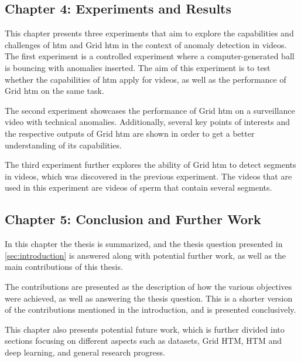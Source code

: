 \subsection*{Chapter 4: Experiments and Results}
This chapter presents three experiments that aim to explore the capabilities and challenges of \gls*{htm} and Grid \gls*{htm} in the context of anomaly detection in videos. The first experiment is a controlled experiment where a computer-generated ball is bouncing with anomalies inserted. The aim of this experiment is to test whether the capabilities of \gls*{htm} apply for videos, as well as the performance of Grid \gls*{htm} on the same task.
\par
The second experiment showcases the performance of Grid \gls*{htm} on a surveillance video with technical anomalies. Additionally, several key points of interests and the respective outputs of Grid \gls*{htm} are shown in order to get a better understanding of its capabilities.
\par
The third experiment further explores the ability of Grid \gls*{htm} to detect segments in videos, which was discovered in the previous experiment. The videos that are used in this experiment are videos of sperm that contain several segments.
\subsection*{Chapter 5: Conclusion and Further Work}
In this chapter the thesis is summarized, and the thesis question presented in \autoref{sec:introduction} is answered along with potential further work, as well as the main contributions of this thesis.
\par
The contributions are presented as the description of how the various objectives were achieved, as well as answering the thesis question. This is a shorter version of the contributions mentioned in the introduction, and is presented conclusively.
\par
This chapter also presents potential future work, which is further divided into sections focusing on different aspects such as datasets, Grid HTM, HTM and deep learning, and general research progress.
